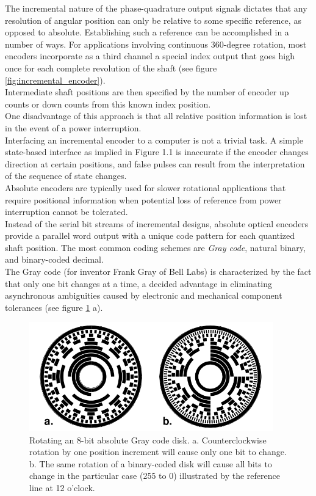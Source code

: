 The incremental nature of the phase-quadrature output signals dictates that
any resolution of angular position can only be relative to some specific
reference, as opposed to absolute. Establishing such a reference can be
accomplished in a number of ways. For applications involving continuous
360-degree rotation, most encoders incorporate as a third channel a special
index output that goes high once for each complete revolution of the shaft
(see figure \ref{fig:incremental_encoder}).
\\
Intermediate shaft positions are then specified by the number of encoder
up counts or down counts from this known index position.
\\
One disadvantage of this approach is that all relative position information
is lost in the event of a power interruption.
\\
Interfacing an incremental encoder to a computer is not a trivial task.
A simple state-based interface as implied in Figure 1.1 is inaccurate if
the encoder changes direction at certain positions, and false pulses can
result from the interpretation of the sequence of state changes.
\\
Absolute encoders are typically used for slower rotational applications
that require positional information when potential loss of reference
from power interruption cannot be tolerated.
\\
Instead of the serial bit streams of incremental designs, absolute optical
encoders provide a parallel word output with a unique code pattern for each
quantized shaft position. The most common coding schemes are \textit{Gray code},
natural binary, and binary-coded decimal.
\\
The Gray code (for inventor Frank Gray of Bell Labs) is characterized by the
fact that only one bit changes at a time, a decided advantage in eliminating
asynchronous ambiguities caused by electronic and mechanical component tolerances
(see figure \ref{fig:absolute_encoder} a).
\begin{figure} [h]
  \begin{center}
    \includegraphics[width=300pt]{img/absolute_encoder.png}
    \caption{Rotating an 8-bit absolute Gray code disk.
      a. Counterclockwise rotation by one position increment will cause
      only one bit to change.
      b. The same rotation of a binary-coded disk will cause all bits to
      change in the particular case (255 to 0) illustrated by the
      reference line at 12 o'clock.}
    \label{fig:absolute_encoder}
  \end{center}
\end{figure}
